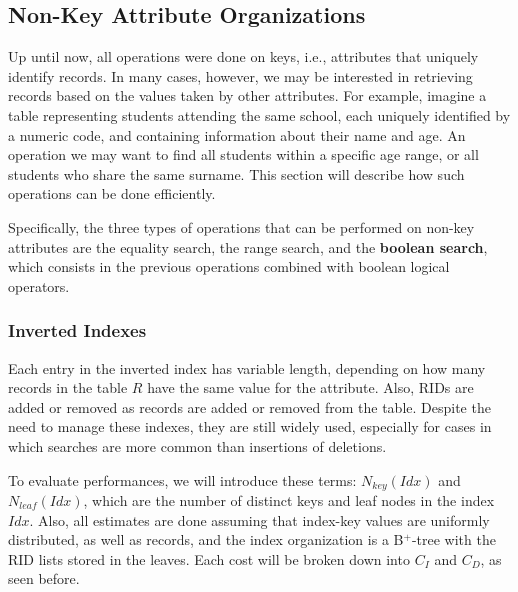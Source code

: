\subsection{Non-Key Attribute Organizations}

Up until now, all operations were done on keys, i.e., attributes that uniquely identify records. In many cases, however, we may be interested in retrieving records based on the values taken by other attributes. For example, imagine a table representing students attending the same school, each uniquely identified by a numeric code, and containing information about their name and age. An operation we may want to find all students within a specific age range, or all students who share the same surname. This section will describe how such operations can be done efficiently.

Specifically, the three types of operations that can be performed on non-key attributes are the equality search, the range search, and the \textbf{boolean search}, which consists in the previous operations combined with boolean logical operators.


\subsubsection{Inverted Indexes}


Each entry in the inverted index has variable length, depending on how many records in the table $R$ have the same value for the attribute. Also, RIDs are added or removed as records are added or removed from the table. Despite the need to manage these indexes, they are still widely used, especially for cases in which searches are more common than insertions of deletions.

To evaluate performances, we will introduce these terms: $N_{key}(Idx)$ and $N_{leaf}(Idx)$, which are the number of distinct keys and leaf nodes in the index $Idx$. Also, all estimates are done assuming that index-key values are uniformly distributed, as well as records, and the index organization is a B$^+$-tree with the RID lists stored in the leaves. Each cost will be broken down into $C_I$ and $C_D$, as seen before.

